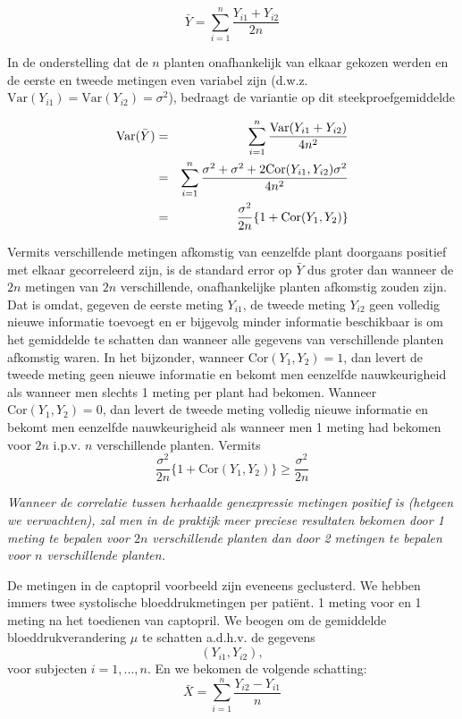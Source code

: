 \documentclass[12pt,dutch,coursenotes]{book}
\theoremstyle{definition}
\theoremstyle{definition}
\theoremstyle{definition}
\theoremstyle{remark}
\begin{document}
\begin{equation*}
\bar Y = \sum_{i=1}^n \frac{Y_{i1}+Y_{i2}}{2n}
\end{equation*}

In de onderstelling dat de \(n\) planten onafhankelijk van elkaar
gekozen werden en de eerste en tweede metingen even variabel zijn
(d.w.z. \(\text{Var}(Y_{i1})=\text{Var}(Y_{i2})=\sigma^2\)), bedraagt de
variantie op dit steekproefgemiddelde

\begin{eqnarray*}
\text{Var}(\bar Y)&=&\sum_{i=1}^n \frac{\text{Var}(Y_{i1}+Y_{i2})}{4n^2} \\
&=&\sum_{i=1}^n \frac{\sigma^2+\sigma^2+2\text{Cor}(Y_{i1},Y_{i2})\sigma^2}{%
4n^2} \\
&=&\frac{\sigma^2}{2n}\{1+\text{Cor}(Y_{1},Y_{2})\}
\end{eqnarray*}

Vermits verschillende metingen afkomstig van eenzelfde plant doorgaans
positief met elkaar gecorreleerd zijn, is de standard error op
\(\bar Y\) dus groter dan wanneer de \(2n\) metingen van \(2n\)
verschillende, onafhankelijke planten afkomstig zouden zijn. Dat is
omdat, gegeven de eerste meting \(Y_{i1}\), de tweede meting \(Y_{i2}\)
geen volledig nieuwe informatie toevoegt en er bijgevolg minder
informatie beschikbaar is om het gemiddelde te schatten dan wanneer alle
gegevens van verschillende planten afkomstig waren. In het bijzonder,
wanneer \(\text{Cor}(Y_{1},Y_{2})=1\), dan levert de tweede meting geen
nieuwe informatie en bekomt men eenzelfde nauwkeurigheid als wanneer men
slechts 1 meting per plant had bekomen. Wanneer
\(\text{Cor}(Y_{1},Y_{2})=0\), dan levert de tweede meting volledig
nieuwe informatie en bekomt men eenzelfde nauwkeurigheid als wanneer men
1 meting had bekomen voor \(2n\) i.p.v. \(n\) verschillende planten.
Vermits
\[\frac{\sigma^2}{2n}\{1+\text{Cor}(Y_{1},Y_{2})\}\geq \frac{\sigma^2}{2n}\]

\emph{Wanneer de correlatie tussen herhaalde genexpressie metingen
positief is (hetgeen we verwachten), zal men in de praktijk meer
preciese resultaten bekomen door 1 meting te bepalen voor \(2n\)
verschillende planten dan door 2 metingen te bepalen voor \(n\)
verschillende planten.}

De metingen in de captopril voorbeeld zijn eveneens geclusterd. We
hebben immers twee systolische bloeddrukmetingen per patiënt. 1 meting
voor en 1 meting na het toedienen van captopril. We beogen om de
gemiddelde bloeddrukverandering \(\mu\) te schatten a.d.h.v. de gegevens
\[(Y_{i1} , Y_{i2}),\] voor subjecten \(i = 1, ..., n\). En we bekomen
de volgende schatting: \[\bar X = \sum_{i=1}^n \frac{Y_{i2}-Y_{i1}}{n}\]
\end{document}
